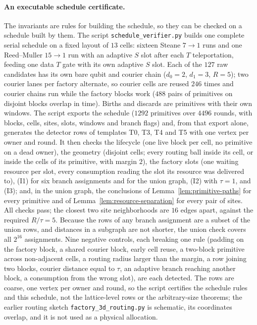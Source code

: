 \documentclass[aps,prx,reprint,superscriptaddress,nofootinbib,floatfix,longbibliography]{revtex4-2}
\theoremstyle{definition}
\begin{document}
\paragraph{An executable schedule certificate.}
The invariants are rules for building the schedule, so they can be checked on
a schedule built by them.  The script \texttt{schedule\_verifier.py} builds
one complete serial schedule on a fixed layout of $13$ cells: sixteen Steane
$7\to1$ runs and one Reed--Muller $15\to1$ run with an adaptive $S$ slot after
each $T$ teleportation, feeding one data $T$ gate with its own adaptive $S$
slot.  Each of the $127$ raw candidates has its own bare qubit and courier
chain ($d_0=2$, $d_1=3$, $R=5$); two courier lanes per factory alternate, so
courier cells are reused $246$ times and courier chains run while the factory
blocks work ($488$ pairs of primitives on disjoint blocks overlap in time).
Births and discards are primitives with their own windows.  The script
exports the schedule ($1292$ primitives over $4496$ rounds, with blocks,
cells, sites, slots, windows and branch flags) and, from that export alone,
generates the detector rows of templates T0, T3, T4 and T5 with one vertex per
owner and round.  It then checks the lifecycle (one live block per cell, no
primitive on a dead owner), the geometry (disjoint cells; every routing ball
inside its cell, or inside the cells of its primitive, with margin $2$), the
factory slots (one waiting resource per slot, every consumption reading the
slot its resource was delivered to), (I1) for six branch assignments and for
the union graph, (I2) with $\tau=1$, and (I3); and, in the union graph, the
conclusions of Lemma~\ref{lem:primitive-paths} for every primitive and of
Lemma~\ref{lem:resource-separation} for every pair of sites.  All checks
pass; the closest two site neighborhoods are $16$ edges apart, against the
required $R/\tau=5$.  Because the rows of any branch assignment are a subset
of the union rows, and distances in a subgraph are not shorter, the union
check covers all $2^{16}$ assignments.  Nine negative controls, each breaking
one rule (padding on the factory block, a shared courier block, early cell
reuse, a two-block primitive across non-adjacent cells, a routing radius
larger than the margin, a row joining two blocks, courier distance equal to
$\tau$, an adaptive branch reaching another block, a consumption from the
wrong slot), are each detected.  The rows are coarse, one vertex per owner and
round, so the script certifies the schedule rules and this schedule, not the
lattice-level rows or the arbitrary-size theorems; the earlier routing sketch
\texttt{factory\_3d\_routing.py} is schematic, its coordinates overlap, and it
is not used as a physical allocation.
\end{document}

